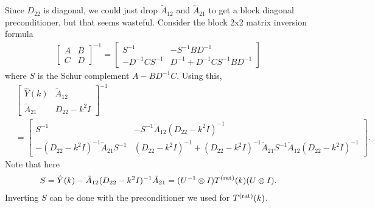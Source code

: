 Since $D_{22}$ is diagonal, we could just drop $\tilde{A}_{12}$ 
and $\tilde{A}_{21}$
to get a block diagonal preconditioner, but that seems wasteful.
Consider the block 2x2 matrix inversion formula
\begin{align*}
 \begin{bmatrix} A & B \\ C & D\end{bmatrix}^{-1}
 =
 \begin{bmatrix}
  S^{-1} & -S^{-1}BD^{-1} \\
  -D^{-1} C S^{-1} & D^{-1} + D^{-1} C S^{-1} B D^{-1}
 \end{bmatrix}
\end{align*}
where $S$ is the Schur complement $A - BD^{-1}C$.
 Using this,
\begin{align*}
 &\begin{bmatrix}
  \hat{Y}(k) & \tilde{A}_{12} \\ 
  \tilde{A}_{21} & D_{22} - k^2 I\end{bmatrix}^{-1} \\ 
 &=
 \begin{bmatrix}
  S^{-1} & -S^{-1}\tilde{A}_{12}(D_{22} - k^2 I)^{-1} \\
  -(D_{22} - k^2 I)^{-1} \tilde{A}_{21} S^{-1} &
  (D_{22} - k^2 I)^{-1} +
  (D_{22} - k^2 I)^{-1} \tilde{A}_{21} S^{-1} \tilde{A}_{12}
  (D_{22} - k^2 I)^{-1}
 \end{bmatrix}.
\end{align*}
Note that here
\begin{align*}
 S = \hat{Y}(k) - \tilde{A}_{12} (D_{22} - k^2I)^{-1}
      \tilde{A}_{21}
   = (U^{-1} \otimes I)T^{(\text{rat})}(k)(U \otimes I).
\end{align*}
Inverting $S$ can be done with the preconditioner we used for
$T^{(\text{rat})}(k)$.

